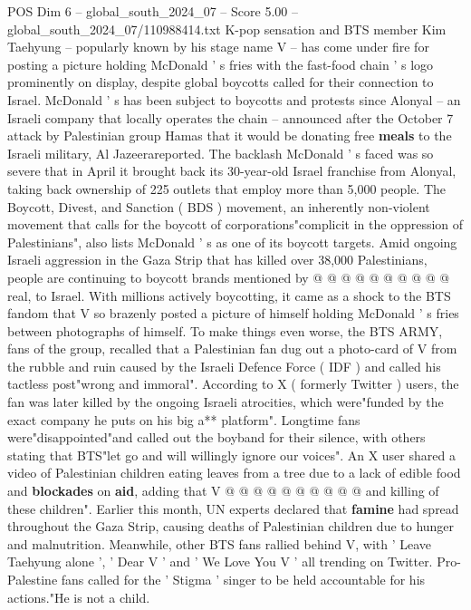 \begin{textsample}{POS Dim 6 – global\_south\_2024\_07 – Score 5.00 – global\_south\_2024\_07/110988414.txt}  \label{ex:f6_pos_318}
K-pop sensation and BTS member Kim Taehyung -- popularly known by his stage name V -- has come under fire for posting a picture holding McDonald ' s fries with the fast-food chain ' s logo prominently on display, despite global boycotts called for their connection to Israel.
McDonald ' s has been subject to boycotts and protests since Alonyal -- an Israeli company that locally operates the chain -- announced after the October 7 attack by Palestinian group Hamas that it would be donating free \textbf{meals} to the Israeli military, Al Jazeerareported.
The backlash McDonald ' s faced was so severe that in April it brought back its 30-year-old Israel franchise from Alonyal, taking back ownership of 225 outlets that employ more than 5,000 people.
The Boycott, Divest, and Sanction ( BDS ) movement, an inherently non-violent movement that calls for the boycott of corporations"complicit in the oppression of Palestinians", also lists McDonald ' s as one of its boycott targets.
Amid ongoing Israeli aggression in the Gaza Strip that has killed over 38,000 Palestinians, people are continuing to boycott brands mentioned by @ @ @ @ @ @ @ @ @ @ real, to Israel.
With millions actively boycotting, it came as a shock to the BTS fandom that V so brazenly posted a picture of himself holding McDonald ' s fries between photographs of himself.
To make things even worse, the BTS ARMY, fans of the group, recalled that a Palestinian fan dug out a photo-card of V from the rubble and ruin caused by the Israeli Defence Force ( IDF ) and called his tactless post"wrong and immoral".
According to X ( formerly Twitter ) users, the fan was later killed by the ongoing Israeli atrocities, which were"funded by the exact company he puts on his big a** platform".
Longtime fans were"disappointed"and called out the boyband for their silence, with others stating that BTS"let go and will willingly ignore our voices".
An X user shared a video of Palestinian children eating leaves from a tree due to a lack of edible food and \textbf{blockades} on \textbf{aid}, adding that V @ @ @ @ @ @ @ @ @ @ and killing of these children".
Earlier this month, UN experts declared that \textbf{famine} had spread throughout the Gaza Strip, causing deaths of Palestinian children due to hunger and malnutrition.
Meanwhile, other BTS fans rallied behind V, with ' Leave Taehyung alone ', ' Dear V ' and ' We Love You V ' all trending on Twitter.
Pro-Palestine fans called for the ' Stigma ' singer to be held accountable for his actions."He is not a child.

\end{textsample}
